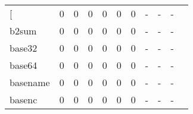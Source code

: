\begin{longtable}{lp{1.20cm}p{1.20cm}p{1.20cm}p{1.20cm}p{1.20cm}p{1.20cm}p{1.20cm}p{1.20cm}p{1.20cm}p{1.20cm}}
\bottomrule
\endlastfoot
{[}         &                                     0 &                                                  0 &                                                  0 &                                                  0 &                                                  0 &                                                  0 &                                             - &                                                  - &                                                  - \\
b2sum     &                                     0 &                                                  0 &                                                  0 &                                                  0 &                                                  0 &                                                  0 &                                             - &                                                  - &                                                  - \\
base32    &                                     0 &                                                  0 &                                                  0 &                                                  0 &                                                  0 &                                                  0 &                                             - &                                                  - &                                                  - \\
base64    &                                     0 &                                                  0 &                                                  0 &                                                  0 &                                                  0 &                                                  0 &                                             - &                                                  - &                                                  - \\
basename  &                                     0 &                                                  0 &                                                  0 &                                                  0 &                                                  0 &                                                  0 &                                             - &                                                  - &                                                  - \\
basenc    &                                     0 &                                                  0 &                                                  0 &                                                  0 &                                                  0 &                                                  0 &                                             - &                                                  - &                                                  - \\

\end{longtable}
